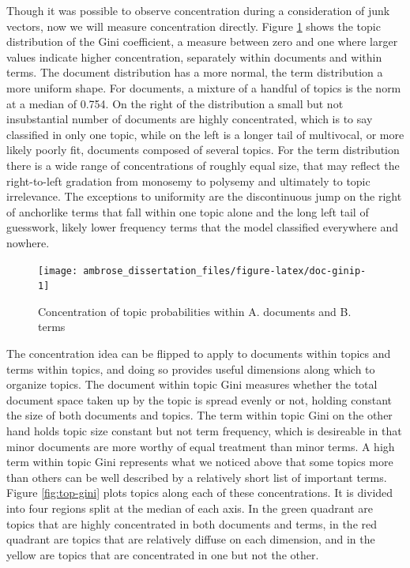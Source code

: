 \documentclass[]{book}
\theoremstyle{definition}
\theoremstyle{definition}
\theoremstyle{definition}
\theoremstyle{remark}
\begin{document}
Though it was possible to observe concentration during a consideration
of junk vectors, now we will measure concentration directly. Figure
\ref{fig:doc-ginip} shows the topic distribution of the Gini
coefficient, a measure between zero and one where larger values indicate
higher concentration, separately within documents and within terms. The
document distribution has a more normal, the term distribution a more
uniform shape. For documents, a mixture of a handful of topics is the
norm at a median of 0.754. On the right of the distribution a small but
not insubstantial number of documents are highly concentrated, which is
to say classified in only one topic, while on the left is a longer tail
of multivocal, or more likely poorly fit, documents composed of several
topics. For the term distribution there is a wide range of
concentrations of roughly equal size, that may reflect the right-to-left
gradation from monosemy to polysemy and ultimately to topic irrelevance.
The exceptions to uniformity are the discontinuous jump on the right of
anchorlike terms that fall within one topic alone and the long left tail
of guesswork, likely lower frequency terms that the model classified
everywhere and nowhere.

\begin{figure}

{\centering \texttt{[image: ambrose\_dissertation\_files/figure-latex/doc-ginip-1]} 

}

\caption{Concentration of topic probabilities within A. documents and B. terms}\label{fig:doc-ginip}
\end{figure}

The concentration idea can be flipped to apply to documents within
topics and terms within topics, and doing so provides useful dimensions
along which to organize topics. The document within topic Gini measures
whether the total document space taken up by the topic is spread evenly
or not, holding constant the size of both documents and topics. The term
within topic Gini on the other hand holds topic size constant but not
term frequency, which is desireable in that minor documents are more
worthy of equal treatment than minor terms. A high term within topic
Gini represents what we noticed above that some topics more than others
can be well described by a relatively short list of important terms.
Figure \ref{fig:top-gini} plots topics along each of these
concentrations. It is divided into four regions split at the median of
each axis. In the green quadrant are topics that are highly concentrated
in both documents and terms, in the red quadrant are topics that are
relatively diffuse on each dimension, and in the yellow are topics that
are concentrated in one but not the other.
\end{document}
